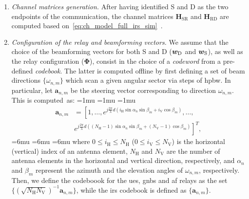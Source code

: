 \begin{enumerate}
    \item \emph{Channel matrices generation.} 
After having identified S and D as the two endpoints of the communication, the channel matrices $\bm{H}_{\textrm {SR}}$ and $\bm{H}_{\textrm {RD}}$ are computed based on~\eqref{eq:ch_model_full_irs_sim}~\cite{3gpp.38.901}. 

\item \emph{Configuration of the relay and beamforming vectors.}
We assume that the choice of the beamforming vectors for both S and D ($\bm{w}_{\textrm D}$ and $\bm{w}_{\textrm S}$), as well as the relay configuration ($\bm{\Phi}$), consist in the choice of a \emph{codeword} from a pre-defined \emph{codebook}. The latter is computed offline by first defining a set of beam directions $\{ \omega_{n, m} \}$ which scan a given angular sector via steps of \gls{hpbw}. In particular, let $\bm{a}_{n,m}$ be the steering vector corresponding to direction $\omega_{n, m}$. This is computed~as:
\medmuskip=1mu
\thinmuskip=1mu
\thickmuskip=1mu
\begin{equation}
\begin{aligned}
    \bm{a}_{n, m} & =  \left[ 1,\ldots, e^{j\frac{2\pi}{\lambda}d\left(i_{\mathrm H}\sin\alpha_n\sin\beta_m+i_{\mathrm V}\cos\beta_m\right)}, \ldots, \right. \\ 
    & \left. e^{j\frac{2\pi}{\lambda}d\left((N_{\mathrm H}-1)\sin\alpha_n\sin\beta_m+(N_{\mathrm V}-1)\cos\beta_m\right)}\right]^T,
\end{aligned}
\end{equation}
\medmuskip=6mu
\thinmuskip=6mu
\thickmuskip=6mu
where $0 \leq i_{\mathrm H} \leq N_{\mathrm H}$ ($0 \leq i_{\mathrm V} \leq N_{\mathrm V}$) is the horizontal (vertical) index of an antenna element, $N_{\mathrm H}$ and $N_{\mathrm V}$ are the number of antenna elements in the horizontal and vertical direction, respectively, and $\alpha_n$ and $\beta_m$ represent the azimuth and the elevation angles of $\omega_{n, m}$, respectively. Then, we define the codeboook for the \glspl{ue}, \glspl{gnb} and \gls{af} relays as the set $\{ \left( \sqrt{N_{\mathrm H} N_{\mathrm V}} \right)^{-1} \bm{a}_{n, m} \}$, while the \gls{irs} codebook is defined as $\{ \bm{a}_{n, m} \}$. 


\end{enumerate}
